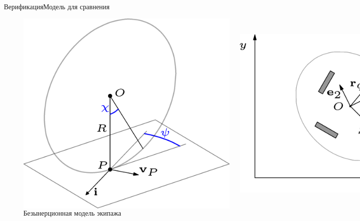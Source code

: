 \documentclass{beamer}
\begin{document}
\begin{frame}{Верификация}{Модель для сравнения}
    \begin{figure}[H]
        \centering
        \begin{columns}
                \centering
                \includegraphics[width=\textwidth]{content/pic/asy/wheel_bor.png}
                \caption{Безынерционная модель колеса}
                \label{fig:bor_wheel_scheme}
                \centering
                \includegraphics[width=\textwidth]{content/pic/asy/cart_bor.png}
                \caption{Безынерционная модель экипажа}
                \label{fig:bor_vehicle}
        \end{columns}
    \end{figure}
\end{frame}
\end{document}
